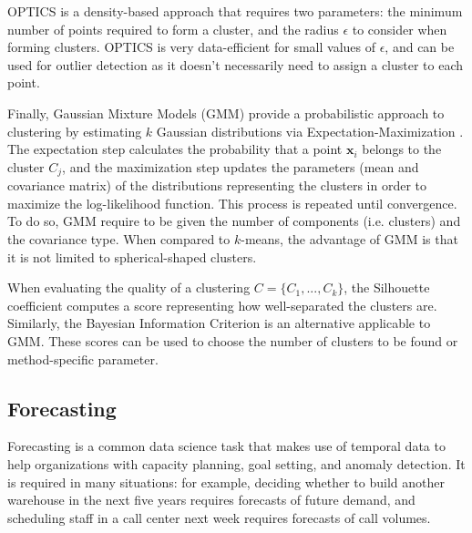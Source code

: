 \documentclass[a4paper, 12pt]{article} %
\begin{document}
	OPTICS \cite{OPTICS} is a density-based approach that requires two parameters: the minimum number of points required to form a cluster, and the radius $\epsilon$ to consider when forming clusters. OPTICS is very data-efficient for small values of $\epsilon$, and can be used for outlier detection as it doesn't necessarily need to assign a cluster to each point.
	
	Finally, Gaussian Mixture Models (GMM) \cite{MixtureModels} provide a probabilistic approach to clustering by estimating $k$ Gaussian distributions via Expectation-Maximization . The expectation step calculates the probability that a point $\pmb{x}_i$ belongs to the cluster $C_j$, and the maximization step updates the parameters (mean and covariance matrix) of the distributions representing the clusters in order to maximize the log-likelihood function. This process is repeated until convergence. To do so, GMM require to be given the number of components (i.e. clusters) and the covariance type. When compared to $k$-means, the advantage of GMM is that it is not limited to spherical-shaped clusters.
	
	When evaluating the quality of a clustering $C=\{C_1, ..., C_k\}$, the Silhouette coefficient \cite{SilhouetteCoefficient} computes a score representing how well-separated the clusters are. Similarly, the Bayesian Information Criterion \cite{BayesianInformationCriterion} is an alternative applicable to GMM. These scores can be used to choose the number of clusters to be found or method-specific parameter.
	
	\subsection{Forecasting } \label{sec:forecasting}
	Forecasting is a common data science task that makes use of temporal data \cite{ForecastingSurvey} to help organizations with capacity planning, goal setting, and anomaly detection. It is required in many situations: for example, deciding whether to build another warehouse in the next five years requires forecasts of future demand, and scheduling staff in a call center next week requires forecasts of call volumes.
	
\end{document}
